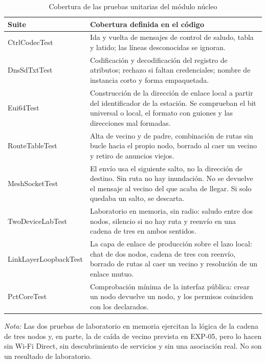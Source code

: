 \documentclass[12pt,oneside]{scrreprt}
\begin{document}
\begin{table}[H]
\centering
\singlespacing
\caption{Cobertura de las pruebas unitarias del módulo núcleo}
\label{tab:pruebas-unitarias}
\renewcommand{\arraystretch}{1.15}
\begin{tabularx}{\textwidth}{@{} >{\raggedright\arraybackslash}p{4.6cm} X @{}}
\toprule
\textbf{Suite} & \textbf{Cobertura definida en el código} \\
\midrule
Ctrl\-Codec\-Test & Ida y vuelta de mensajes de control de saludo, tabla y latido; las líneas desconocidas se ignoran. \\
Dns\-Sd\-Txt\-Test & Codificación y decodificación del registro de atributos; rechazo si faltan credenciales; nombre de instancia corto y forma empaquetada. \\
Eui64\-Test & Construcción de la dirección de enlace local a partir del identificador de la estación. Se comprueban el bit universal o local, el formato con guiones y las direcciones mal formadas. \\
Route\-Table\-Test & Alta de vecino y de padre, combinación de rutas sin bucle hacia el propio nodo, borrado al caer un vecino y retiro de anuncios viejos. \\
Mesh\-Socket\-Test & El envío usa el siguiente salto, no la dirección de destino. Sin ruta no hay inundación. No se devuelve el mensaje al vecino del que acaba de llegar. Si solo quedaba un salto, se descarta. \\
Two\-Device\-Lab\-Test & Laboratorio en memoria, sin radio: saludo entre dos nodos, silencio si no hay ruta y reenvío en una cadena de tres en ambos sentidos. \\
Link\-Layer\-Loop\-back\-Test & La capa de enlace de producción sobre el lazo local: chat de dos nodos, cadena de tres con reenvío, borrado de rutas al caer un vecino y resolución de un enlace mutuo. \\
Pct\-Core\-Test & Comprobación mínima de la interfaz pública: crear un nodo devuelve un nodo, y los permisos coinciden con los declarados. \\
\bottomrule
\end{tabularx}
\par\vspace{0.2cm}
\small \raggedright \textit{Nota:} Las dos pruebas de laboratorio en memoria ejercitan la lógica de la cadena de tres nodos y, en parte, la de caída de vecino prevista en EXP-05, pero lo hacen sin Wi-Fi Direct, sin descubrimiento de servicios y sin una asociación real. No son un resultado de laboratorio.
\end{table}
\end{document}
